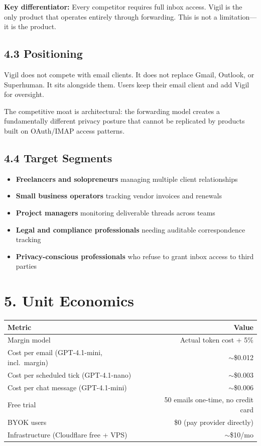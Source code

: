\documentclass[10pt]{article}
\begin{document}
\textbf{Key differentiator:} Every competitor requires full inbox access. Vigil is the only product
that operates entirely through forwarding. This is not a limitation---it is the product.

\subsection*{4.3 Positioning}
Vigil does not compete with email clients. It does not replace Gmail, Outlook, or Superhuman.
It sits alongside them. Users keep their email client and add Vigil for oversight.

The competitive moat is architectural: the forwarding model creates a fundamentally different
privacy posture that cannot be replicated by products built on OAuth/IMAP access patterns.

\subsection*{4.4 Target Segments}
\begin{itemize}[nosep]
  \item \textbf{Freelancers and solopreneurs} managing multiple client relationships
  \item \textbf{Small business operators} tracking vendor invoices and renewals
  \item \textbf{Project managers} monitoring deliverable threads across teams
  \item \textbf{Legal and compliance professionals} needing auditable correspondence tracking
  \item \textbf{Privacy-conscious professionals} who refuse to grant inbox access to third parties
\end{itemize}

\section*{5. Unit Economics}

\begin{center}
\begin{tabular}{lr}
\toprule
\textbf{Metric} & \textbf{Value} \\
\midrule
Margin model & Actual token cost + 5\% \\
Cost per email (GPT-4.1-mini, incl.\ margin) & $\sim$\$0.012 \\
Cost per scheduled tick (GPT-4.1-nano) & $\sim$\$0.003 \\
Cost per chat message (GPT-4.1-mini) & $\sim$\$0.006 \\
Free trial & 50 emails one-time, no credit card \\
BYOK users & \$0 (pay provider directly) \\
Infrastructure (Cloudflare free + VPS) & $\sim$\$10/mo \\
\bottomrule
\end{tabular}
\end{center}
\end{document}
